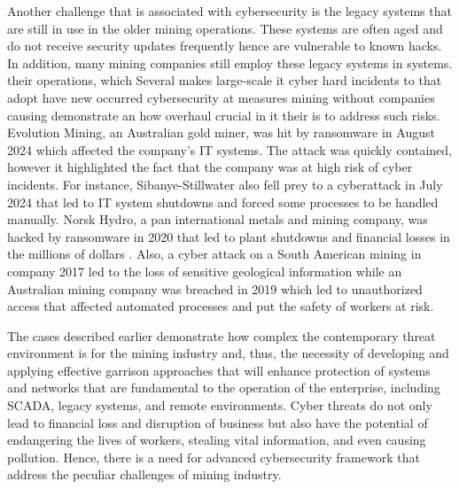\documentclass[a4paper,twoside,12pt]{report}
\begin{document}
 Another challenge that is associated with cybersecurity is the legacy systems  that are still in use in the older mining operations. These systems are often aged and do not receive  security updates frequently hence are vulnerable to known hacks. In addition, many mining companies still employ these legacy  systems in systems. their 
 operations, which Several makes large-scale it cyber hard incidents to that adopt have new occurred cybersecurity at measures mining without companies causing demonstrate an how overhaul crucial in it their is  to  address such risks. Evolution Mining, an Australian gold miner, was hit by ransomware in August  2024 which affected the company’s IT systems. The attack was quickly contained, however it highlighted the  fact that the company was at high risk of cyber incidents. For instance,  Sibanye-Stillwater \citet{cameron2024sibanye} also fell prey to a cyberattack  in July 2024 that led to IT system shutdowns and forced some processes to be handled  manually. Norsk Hydro, a pan international metals and mining company, was hacked by ransomware in  2020 that led to plant shutdowns and financial losses in the millions of dollars  \citet{ravichandran2024comprehensive}. Also, a cyber attack on a South American mining in company 2017  led to the loss of sensitive geological information while an Australian mining company was breached in  2019 which led to unauthorized access that affected automated processes and put the safety of workers at  risk. 
 
 The cases described earlier demonstrate how complex the contemporary threat environment is for the mining industry and,  thus, the necessity of developing and applying effective garrison approaches that will enhance protection of systems and networks  that are fundamental to the operation of the enterprise, including SCADA, legacy systems, and remote  environments. Cyber threats do not only lead to financial loss and disruption of business but also have the potential of  endangering the lives of workers, stealing vital information, and even causing pollution. Hence, there is  a need for advanced cybersecurity framework that address the peculiar challenges of mining industry. 
\end{document}
